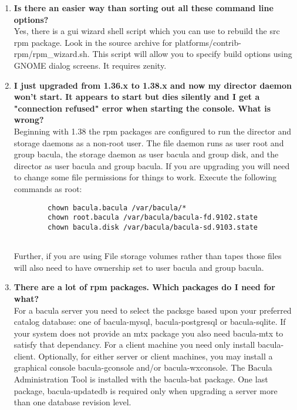 \begin{enumerate}
\item 
   \label{faq7}
   {\bf Is there an easier way than sorting out all these command line options?}
   \\
   Yes, there is a gui wizard shell script which you can use to rebuild the
   src rpm package.  Look in the source archive for
   platforms/contrib-rpm/rpm\_wizard.sh.  This script will allow you to
   specify build options using GNOME dialog screens.  It requires zenity.

\item 
   \label{faq8}
   {\bf I just upgraded from 1.36.x to 1.38.x and now my director daemon
won't start.  It appears to start but dies silently and I get a "connection
refused" error when starting the console.  What is wrong?} \\
   Beginning with 1.38 the rpm packages are configured to run the director
   and storage daemons as a non-root user.  The file daemon runs as user
   root and group bacula, the storage daemon as user bacula and group disk,
   and the director as user bacula and group bacula.  If you are upgrading
   you will need to change some file permissions for things to work.
   Execute the following commands as root:

\footnotesize
\begin{verbatim}
        chown bacula.bacula /var/bacula/*
        chown root.bacula /var/bacula/bacula-fd.9102.state
        chown bacula.disk /var/bacula/bacula-sd.9103.state
        
\end{verbatim}
\normalsize

Further, if you are using File storage volumes rather than tapes those
files will also need to have ownership set to user bacula and group bacula.

\item 
   \label{faq9}
   {\bf There are a lot of rpm packages.  Which packages do I need for
what?} \\
For a bacula server you need to select the packsge based upon your
preferred catalog database: one of bacula-mysql, bacula-postgresql or
bacula-sqlite.  If your system does not provide an mtx package you also
need bacula-mtx to satisfy that dependancy.  For a client machine you need
only install bacula-client.  Optionally, for either server or client
machines, you may install a graphical console bacula-gconsole and/or
bacula-wxconsole. The Bacula Administration Tool is installed with the 
bacula-bat package.  One last package, bacula-updatedb is required only when
upgrading a server more than one database revision level.


\end{enumerate}
